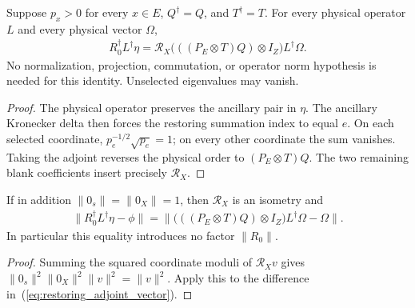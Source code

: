 \begin{theorem}
    \label{thm:restoring_adjoint_vector}
    \leanok
    Suppose $p_x>0$ for every $x\in E$, $Q^\dagger=Q$, and $T^\dagger=T$.
    For every physical operator $L$ and every physical vector $\Omega$,
    \begin{align}
        R_0^\dagger L^\dagger\eta
            =\mathcal R_X\bigl(((P_E\otimes T)Q)\otimes I_Z\bigr)
                L^\dagger\Omega.
        \label{eq:restoring_adjoint_vector}
    \end{align}
    No normalization, projection, commutation, or operator norm hypothesis
    is needed for this identity. Unselected eigenvalues may vanish.
\end{theorem}
\begin{proof}\leanok
    The physical operator preserves the ancillary pair in $\eta$.
    The ancillary Kronecker delta then forces the restoring summation
    index to equal $e$. On each selected coordinate,
    $p_e^{-1/2}\sqrt{p_e}=1$; on every other coordinate the sum vanishes.
    Taking the adjoint reverses the physical order to $(P_E\otimes T)Q$.
    The two remaining blank coefficients insert precisely $\mathcal R_X$.
\end{proof}

\begin{theorem}
    \label{thm:restoring_adjoint_error}
    \leanok
    If in addition $\|0_s\|=\|0_X\|=1$, then $\mathcal R_X$ is an isometry
    and
    \begin{align}
        \|R_0^\dagger L^\dagger\eta-\phi\|
        =\|\bigl(((P_E\otimes T)Q)\otimes I_Z\bigr)L^\dagger\Omega
              -\Omega\|.
    \end{align}
    In particular this equality introduces no factor $\|R_0\|$.
\end{theorem}
\begin{proof}\leanok
    Summing the squared coordinate moduli of $\mathcal R_X v$ gives
    $\|0_s\|^2\|0_X\|^2\|v\|^2=\|v\|^2$. Apply this to the difference
    in~(\ref{eq:restoring_adjoint_vector}).
\end{proof}

